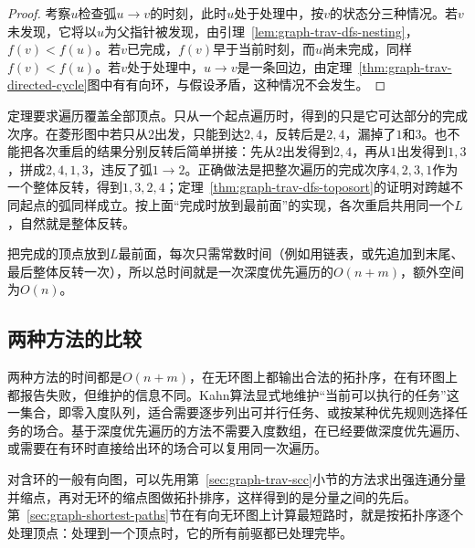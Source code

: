 \begin{proof}
考察$u$检查弧$u\to v$的时刻，此时$u$处于处理中，按$v$的状态分三种情况。若$v$未发现，它将以$u$为父指针被发现，由引理~\ref{lem:graph-trav-dfs-nesting}，$f(v)<f(u)$。若$v$已完成，$f(v)$早于当前时刻，而$u$尚未完成，同样$f(v)<f(u)$。若$v$处于处理中，$u\to v$是一条回边，由定理~\ref{thm:graph-trav-directed-cycle}图中有有向环，与假设矛盾，这种情况不会发生。
\end{proof}

定理要求遍历覆盖全部顶点。只从一个起点遍历时，得到的只是它可达部分的完成次序。在菱形图中若只从$2$出发，只能到达$2,4$，反转后是$2,4$，漏掉了$1$和$3$。也不能把各次重启的结果分别反转后简单拼接：先从$2$出发得到$2,4$，再从$1$出发得到$1,3$，拼成$2,4,1,3$，违反了弧$1\to2$。正确做法是把整次遍历的完成次序$4,2,3,1$作为一个整体反转，得到$1,3,2,4$；定理~\ref{thm:graph-trav-dfs-toposort}的证明对跨越不同起点的弧同样成立。按上面“完成时放到最前面”的实现，各次重启共用同一个$L$，自然就是整体反转。

把完成的顶点放到$L$最前面，每次只需常数时间（例如用链表，或先追加到末尾、最后整体反转一次），所以总时间就是一次深度优先遍历的$O(n+m)$，额外空间为$O(n)$。

\subsection{两种方法的比较}
\label{sec:graph-trav-topo-comparison}

两种方法的时间都是$O(n+m)$，在无环图上都输出合法的拓扑序，在有环图上都报告失败，但维护的信息不同。Kahn算法显式地维护“当前可以执行的任务”这一集合，即零入度队列，适合需要逐步列出可并行任务、或按某种优先规则选择任务的场合。基于深度优先遍历的方法不需要入度数组，在已经要做深度优先遍历、或需要在有环时直接给出环的场合可以复用同一次遍历。

对含环的一般有向图，可以先用第~\ref{sec:graph-trav-scc}小节的方法求出强连通分量并缩点，再对无环的缩点图做拓扑排序，这样得到的是分量之间的先后。第~\ref{sec:graph-shortest-paths}节在有向无环图上计算最短路时，就是按拓扑序逐个处理顶点：处理到一个顶点时，它的所有前驱都已处理完毕。
